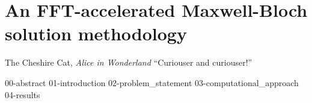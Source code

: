 \chapter{\label{ch:accelerator}An FFT-accelerated Maxwell-Bloch solution methodology}

\begin{frontquote}{The Cheshire Cat, \emph{Alice in Wonderland}}
  ``Curiouser and curiouser!''
\end{frontquote}

{00-abstract}
{01-introduction}
{02-problem_statement}
{03-computational_approach}
{04-results}
